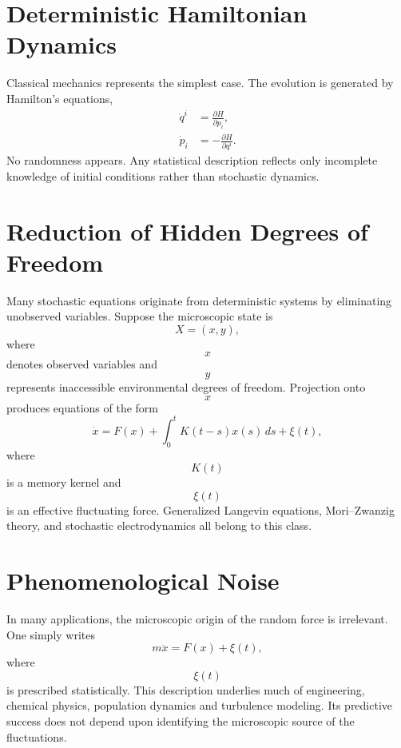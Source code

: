 \section{Deterministic Hamiltonian Dynamics}
Classical mechanics represents the simplest case.
The evolution is generated by Hamilton's equations,
\begin{align}
\dot q^i&=\frac{\partial H}{\partial p_i},\\
\dot p_i&=-\frac{\partial H}{\partial q^i}.
\end{align}
No randomness appears.
Any statistical description reflects only incomplete knowledge of
initial conditions rather than stochastic dynamics.
\section{Reduction of Hidden Degrees of Freedom}
Many stochastic equations originate from deterministic systems by
eliminating unobserved variables.
Suppose the microscopic state is
\[X=(x,y),\]
where
\[x\]
denotes observed variables and
\[y\]
represents inaccessible environmental degrees of freedom.
Projection onto
\[x\]
produces equations of the form
\begin{equation}
\dot x=F(x)+\int_0^tK(t-s)x(s)\,ds+\xi(t),
\end{equation}
where
\[K(t)\]
is a memory kernel and
\[\xi(t)\]
is an effective fluctuating force.
Generalized Langevin equations, Mori--Zwanzig theory, and stochastic
electrodynamics all belong to this class.
\section{Phenomenological Noise}
In many applications, the microscopic origin of the random force is
irrelevant.
One simply writes
\begin{equation}
m\ddot x=F(x)+\xi(t),
\end{equation}
where
\[\xi(t)\]
is prescribed statistically.
This description underlies much of engineering, chemical physics,
population dynamics and turbulence modeling.
Its predictive success does not depend upon identifying the microscopic
source of the fluctuations.
